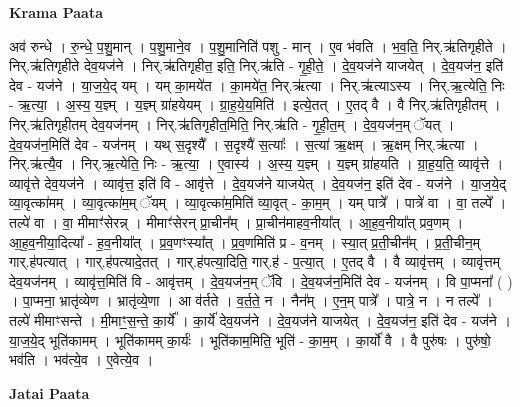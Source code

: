 \documentclass[17pt]{extarticle}
\begin{document}
\textbf{Krama Paata} \newline

अव॑ रुन्धे । रु॒न्धे॒ प॒शु॒मान् । प॒शु॒माने॒व । प॒शु॒मानिति॑ पशु - मान् । ए॒व भ॑वति । भ॒व॒ति॒ निर्.ऋ॑तिगृहीते । निर्.ऋ॑तिगृहीते देव॒यज॑ने । निर्.ऋ॑तिगृहीत॒ इति॒ निर्.ऋ॑ति - गृ॒ही॒ते॒ । दे॒व॒यज॑ने याजयेत् । दे॒व॒यज॑न॒ इति॑ देव - यज॑ने । या॒ज॒ये॒द् यम् । यम् का॒मये॑त । का॒मये॑त॒ निर्.ऋ॑त्या । निर्.ऋ॑त्याऽस्य । निर्.ऋ॒त्येति॒ निः - ऋ॒त्या॒ । अ॒स्य॒ य॒ज्ञ्म् । य॒ज्ञ्म् ग्रा॑हयेयम् । ग्रा॒ह॒ये॒य॒मिति॑ । इत्ये॒तत् । ए॒तद् वै । वै निर्.ऋ॑तिगृहीतम् । निर्.ऋ॑तिगृहीतम् देव॒यज॑नम् । निर्.ऋ॑तिगृहीत॒मिति॒ निर्.ऋ॑ति - गृ॒ही॒त॒म् । दे॒व॒यज॑न॒म् ॅयत् । दे॒व॒यज॑न॒मिति॑ देव - यज॑नम् । यथ् स॒दृश्यै᳚ । स॒दृश्यै॑ स॒त्याः᳚ । स॒त्या॑ ऋ॒क्षम् । ऋ॒क्षम् निर्.ऋ॑त्या । निर्.ऋ॑त्यै॒व । निर्.ऋ॒त्येति॒ निः - ऋ॒त्या॒ । ए॒वास्य॑ । अ॒स्य॒ य॒ज्ञ्म् । य॒ज्ञ्म् ग्रा॑हयति । ग्रा॒ह॒य॒ति॒ व्यावृ॑त्ते । व्यावृ॑त्ते देव॒यज॑ने । व्यावृ॑त्त॒ इति॑ वि - आवृ॑त्ते । दे॒व॒यज॑ने याजयेत् । दे॒व॒यज॑न॒ इति॑ देव - यज॑ने । या॒ज॒ये॒द् व्या॒वृत्का॑मम् । व्या॒वृत्का॑म॒म् ॅयम् । व्या॒वृत्का॑म॒मिति॑ व्या॒वृत् - का॒म॒म् । यम् पात्रे᳚ । पात्रे॑ वा । वा॒ तल्पे᳚ । तल्पे॑ वा । वा॒ मीमाꣳ॑सेरन्न् । मीमाꣳ॑सेरन् प्रा॒चीन᳚म् । प्रा॒चीन॑माहव॒नीया᳚त् । आ॒ह॒व॒नीया᳚त् प्रव॒णम् । आ॒ह॒व॒नीया॒दित्या᳚ - ह॒व॒नीया᳚त् । प्र॒व॒णꣳस्या᳚त् । प्र॒व॒णमिति॑ प्र - व॒नम् । स्या॒त् प्र॒ती॒चीन᳚म् । प्र॒ती॒चीन॒म् गार्.ह॑पत्यात् । गार्.ह॑पत्यादे॒तत् । गार्.ह॑पत्या॒दिति॒ गार्.ह॑ - प॒त्या॒त् । ए॒तद् वै । वै व्यावृ॑त्तम् । व्यावृ॑त्तम् देव॒यज॑नम् । व्यावृ॑त्त॒मिति॑ वि - आवृ॑त्तम् । दे॒व॒यज॑न॒म् ॅवि । दे॒व॒यज॑न॒मिति॑ देव - यज॑नम् । वि पा॒प्मना᳚ ( ) । पा॒प्मना॒ भ्रातृ॑व्येण । भ्रातृ॑व्ये॒णा । आ व॑र्तते । व॒र्त॒ते॒ न । नैन᳚म् । ए॒न॒म् पात्रे᳚ । पात्रे॒ न । न तल्पे᳚ । तल्पे॑ मीमाꣳसन्ते । मी॒माꣳ॒॒स॒न्ते॒ का॒र्ये᳚ । का॒र्ये॑ देव॒यज॑ने । दे॒व॒यज॑ने याजयेत् । दे॒व॒यज॑न॒ इति॑ देव - यज॑ने । या॒ज॒ये॒द् भूति॑कामम् । भूति॑कामम् का॒र्यः॑ । भूति॑काम॒मिति॒ भूति॑ - का॒म॒म् । का॒र्यो॑ वै । वै पुरु॑षः । पुरु॑षो॒ भव॑ति । भव॑त्ये॒व । ए॒वेत्ये॒व । \newline

\textbf{Jatai Paata} \newline
\end{document}
